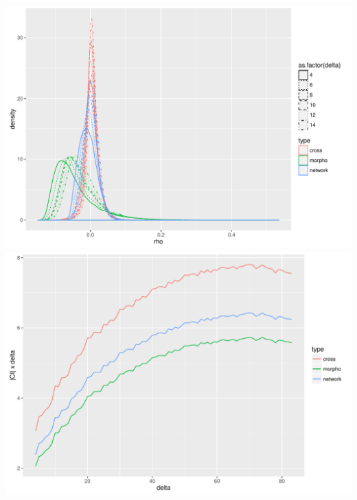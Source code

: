 \documentclass[english,11pt]{beamer}
\begin{document}
{\begin{columns}
\centering
\includegraphics[width=\textwidth]{figures/morpho_corrs-distrib_varyingdelta_bytype.pdf}\\
\includegraphics[width=\textwidth]{figures/corr_normalized_CI_delta}
\end{columns}



\centering

%


}



\end{document}
